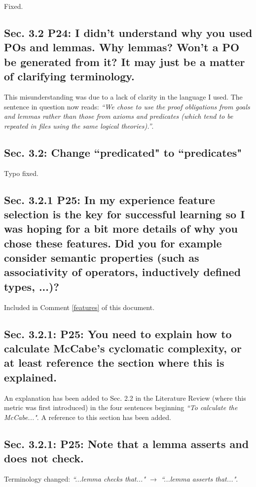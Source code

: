 \documentclass[]{article}
\begin{document}
Fixed.

\subsection{Sec. 3.2 P24: I didn't understand why you used POs and lemmas. Why lemmas? Won't a PO be generated from it? It may just be a matter of clarifying terminology.}

This misunderstanding was due to a lack of clarity in the language I used. The sentence in question now reads: \emph{``We chose to use the proof obligations from goals and lemmas rather than those from axioms and predicates (which tend to be repeated in files using the same logical theories).''}.

\subsection{Sec. 3.2: Change ``predicated" to ``predicates"}

Typo fixed.

\subsection{Sec. 3.2.1 P25: In my experience feature selection is the key for successful learning so I was hoping for a bit more details of why you chose these features. Did you for example consider semantic properties (such as associativity of operators, inductively defined types, ...)?}

Included in Comment \ref{features} of this document. 

\subsection{Sec. 3.2.1: P25: You need to explain how to calculate McCabe's cyclomatic complexity, or at least reference the section where this is explained.}

An explanation has been added to Sec. 2.2 in the Literature Review (where this metric was first introduced) in the four sentences beginning \emph{``To calculate the McCabe..."}. A reference to this section has been added.

\subsection{Sec. 3.2.1: P25: Note that a lemma asserts and does not check.}

Terminology changed: \emph{``...lemma checks that..." $\rightarrow$ ``...lemma asserts that..."}.
\end{document}
